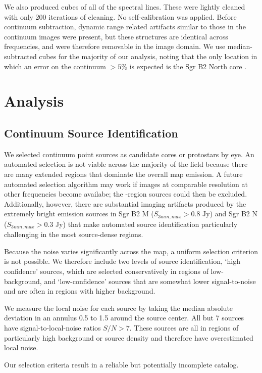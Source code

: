 \documentclass{emulateapj}
\begin{document}
We also produced cubes of all of the spectral lines.  These were lightly
cleaned with only 200 iterations of cleaning.  No self-calibration was applied.
Before continuum subtraction, dynamic range related artifacts similar to those
in the continuum images were present, but these structures are identical across
frequencies, and were therefore removable in the image domain.  We use
median-subtracted cubes for the majority of our analysis, noting that the only
location in which an error on the continuum $>5\%$ is expected is the Sgr B2
North core \citep{Sanchez-Monge2017a}.

\section{Analysis}

\subsection{Continuum Source Identification}
We selected continuum point sources as candidate cores or protostars by eye.
An automated selection is not viable across the majority of the field because
there are many extended \hii regions that dominate the overall map emission.  A
future automated selection algorithm may work if images at comparable
resolution at other frequencies become availabe; the \hii-region sources could
then be excluded.  Additionally, however, there are substantial imaging
artifacts produced by the extremely bright emission sources in Sgr B2 M ($S_{3
mm,max} > 0.8$ Jy) and Sgr B2 N ($S_{3 mm,max} > 0.3$ Jy) that make automated
source identification particularly challenging in the most source-dense regions.

Because the noise varies significantly across the map, a uniform selection
criterion is not possible.  We therefore include two levels of source
identification, `high confidence' sources, which are selected conservatively in
regions of low-background, and `low-confidence' sources that are somewhat lower
signal-to-noise and are often in regions with higher background. 

We measure the local noise for each source by taking the median absolute
deviation in an annulus 0.5 to 1.5 \arcsec around the source center.
All but 7 sources have signal-to-local-noise ratios $S/N>7$.  These
sources are all in regions of particularly high background or source
density and therefore have overestimated local noise.

Our selection criteria result in a reliable but potentially incomplete catalog.
\end{document}
